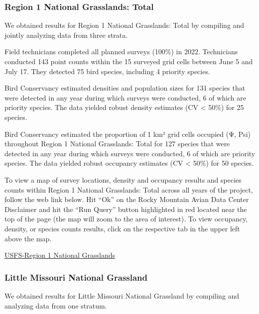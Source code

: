 \documentclass[
  letterpaper,
  DIV=11,
  numbers=noendperiod,
  oneside]{scrreprt}
\begin{document}
\hypertarget{region-1-national-grasslands-total}{%
\subsubsection{Region 1 National Grasslands:
Total}\label{region-1-national-grasslands-total}}

We obtained results for Region 1 National Grasslands: Total by compiling
and jointly analyzing data from three strata.

Field technicians completed all planned surveys (100\%) in 2022.
Technicians conducted 143 point counts within the 15 surveyed grid cells
between June 5 and July 17. They detected 75 bird species, including 4
priority species.

Bird Conservancy estimated densities and population sizes for 131
species that were detected in any year during which surveys were
conducted, 6 of which are priority species. The data yielded robust
density estimates (CV \textless{} 50\%) for 25 species.

Bird Conservancy estimated the proportion of 1 km² grid cells occupied
(Ψ, Psi) throughout Region 1 National Grasslands: Total for 127 species
that were detected in any year during which surveys were conducted, 6 of
which are priority species. The data yielded robust occupancy estimates
(CV \textless{} 50\%) for 50 species.

To view a map of survey locations, density and occupancy results and
species counts within Region 1 National Grasslands: Total across all
years of the project, follow the web link below. Hit ``Ok'' on the Rocky
Mountain Avian Data Center Disclaimer and hit the ``Run Query'' button
highlighted in red located near the top of the page (the map will zoom
to the area of interest). To view occupancy, density, or species counts
results, click on the respective tab in the upper left above the map.

\href{http://www.rmbo.org/new_site/adc/QueryWindow.aspx\#N4IgzgrgDgpgTmALnAhoiBbEAuABCAVQGUAxIgWgCUYBzASwHsA7XARlwDk1GmUAbXAHFUYMHxRMAJmBABfIA===}{USFS-Region
1 National Grasslands}

\hypertarget{little-missouri-national-grassland}{%
\subsubsection{Little Missouri National
Grassland}\label{little-missouri-national-grassland}}

We obtained results for Little Missouri National Grassland by compiling
and analyzing data from one stratum.
\end{document}
